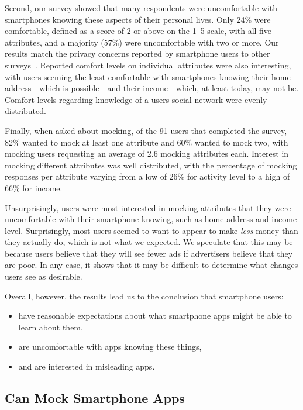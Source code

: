 Second, our survey showed that many respondents were uncomfortable with
smartphones knowing these aspects of their personal lives. Only 24\% were
comfortable, defined as a score of 2 or above on the 1--5 scale, with all
five attributes, and a majority (57\%) were uncomfortable with two or more.
Our results match the privacy concerns reported by smartphone users to other
surveys~\cite{truste-privacy}. Reported comfort levels on individual
attributes were also interesting, with users seeming the least comfortable
with smartphones knowing their home address---which is possible---and their
income---which, at least today, may not be. Comfort levels regarding
knowledge of a users social network were evenly distributed.

Finally, when asked about mocking, of the 91 users that completed the survey,
82\% wanted to mock at least one attribute and 60\% wanted to mock two, with
mocking users requesting an average of 2.6 mocking attributes each. Interest
in mocking different attributes was well distributed, with the percentage of
mocking responses per attribute varying from a low of 26\% for activity level
to a high of 66\% for income.

Unsurprisingly, users were most interested in mocking attributes that they
were uncomfortable with their smartphone knowing, such as home address and
income level. Surprisingly, most users seemed to want to appear to make
\textit{less} money than they actually do, which is not what we expected. We
speculate that this may be because users believe that they will see fewer ads
if advertisers believe that they are poor. In any case, it shows that it may
be difficult to determine what changes users see as desirable.

\newpage
Overall, however, the results lead us to the conclusion that smartphone
users:
\begin{itemize}

\item have reasonable expectations about what smartphone apps might be able to
learn about them,
\item are uncomfortable with apps knowing these things,
\item and are interested in misleading apps.

\end{itemize}

\subsection{\PocketMocker{} Can Mock Smartphone Apps}
\label{subsec-mockingapps}

